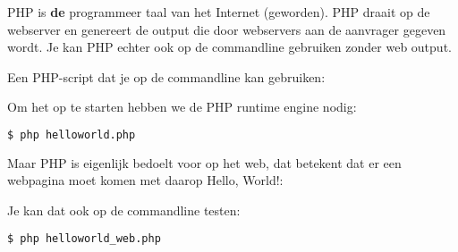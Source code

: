PHP is \textbf{de} programmeer taal van het Internet (geworden). PHP draait op de webserver en genereert de output die door webservers aan de aanvrager gegeven wordt. Je kan PHP echter ook op de commandline gebruiken zonder web output.

Een PHP-script dat je op de commandline kan gebruiken:


Om het op te starten hebben we de PHP runtime engine nodig:
\begin{lstlisting}[language=bash]
$ php helloworld.php
\end{lstlisting}

Maar PHP is eigenlijk bedoelt voor op het web, dat betekent dat er een webpagina moet komen met daarop Hello, World!:


Je kan dat ook op de commandline testen:
\begin{lstlisting}[language=bash]
$ php helloworld_web.php
\end{lstlisting}
